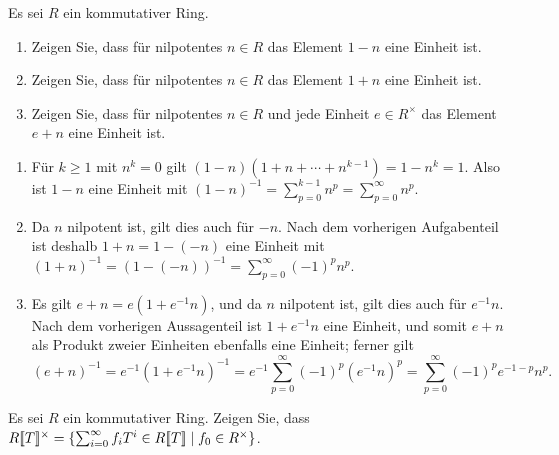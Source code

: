 \begin{question}[subtitle = Nilpotente zu Einheiten]
  Es sei $R$ ein kommutativer Ring.
  \begin{enumerate}
    \item
      Zeigen Sie, dass für nilpotentes $n \in R$ das Element $1 - n$ eine Einheit ist.
    \item
      Zeigen Sie, dass für nilpotentes $n \in R$ das Element $1 + n$ eine Einheit ist.
    \item
      Zeigen Sie, dass für nilpotentes $n \in R$ und jede Einheit $e \in R^\times$ das Element $e + n$ eine Einheit ist.
  \end{enumerate}
\end{question}


\begin{solution}
  \begin{enumerate}
    \item
      Für $k \geq 1$ mit $n^k = 0$ gilt $(1 - n)(1 + n + \dotsb + n^{k-1}) = 1 - n^k = 1$.
      Also ist $1 - n$ eine Einheit mit $(1-n)^{-1} = \sum_{p=0}^{k-1} n^p = \sum_{p=0}^\infty n^p$.
    \item
      Da $n$ nilpotent ist, gilt dies auch für $-n$.
      Nach dem vorherigen Aufgabenteil ist deshalb $1 + n = 1 - (-n)$ eine Einheit mit $(1 + n)^{-1} = (1 - (-n))^{-1} = \sum_{p=0}^\infty (-1)^p n^p$.
    \item
      Es gilt $e + n = e(1 + e^{-1} n)$, und da $n$ nilpotent ist, gilt dies auch für $e^{-1} n$.
      Nach dem vorherigen Aussagenteil ist $1 + e^{-1} n$ eine Einheit, und somit $e + n$ als Produkt zweier Einheiten ebenfalls eine Einheit; ferner gilt
      \[
          (e + n)^{-1}
        = e^{-1} (1 + e^{-1} n)^{-1}
        = e^{-1} \sum_{p=0}^\infty (-1)^p (e^{-1} n)^p
        = \sum_{p=0}^\infty (-1)^p e^{-1-p} n^p.
      \]
  \end{enumerate}
\end{solution}


\begin{question}[subtitle = Die Einheitengruppe des Potenzreihenrings]
  \label{question: unit group of the power series ring}
  Es sei $R$ ein kommutativer Ring.
  Zeigen Sie, dass $R[\![T]\!]^\times = \{\sum_{i=0}^\infty f_i T^i \in R[\![T]\!] \mid f_0 \in R^\times\}$.
\end{question}


